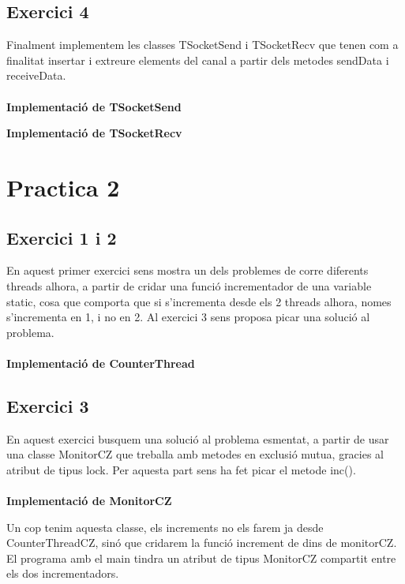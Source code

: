 \documentclass[12pt, a4papre]{article}
\begin{document}
	\subsection{Exercici 4} 
	Finalment implementem les classes TSocketSend i TSocketRecv que tenen com a finalitat insertar i extreure elements del canal a partir dels metodes sendData i receiveData.
	\\\\
	\textbf{Implementació de TSocketSend}
	
	
	\textbf{Implementació de TSocketRecv}
	
	
	\newpage	
	\section{Practica 2}
	
	\subsection{Exercici 1 i 2} 
	
	En aquest primer exercici sens mostra un dels problemes de corre diferents threads alhora, a partir de cridar una funció incrementador de una variable static, cosa que comporta que si s'incrementa desde els 2 threads alhora, nomes s'incrementa en 1, i no en 2. Al exercici 3 sens proposa picar una solució al problema.
	\\\\
	\textbf{Implementació de CounterThread}
	
	
	\subsection{Exercici 3} 
	
	En aquest exercici busquem una solució al problema esmentat, a partir de usar una classe MonitorCZ que treballa amb metodes en exclusió mutua, gracies al atribut de tipus lock. Per aquesta part sens ha fet picar el metode inc().
	\\\\
	\textbf{Implementació de MonitorCZ}
	
	
	Un cop tenim aquesta classe, els increments no els farem ja desde CounterThreadCZ, sinó que cridarem la funció increment de dins de monitorCZ. El programa amb el main tindra un atribut de tipus MonitorCZ compartit entre els dos incrementadors.
	
\end{document}
